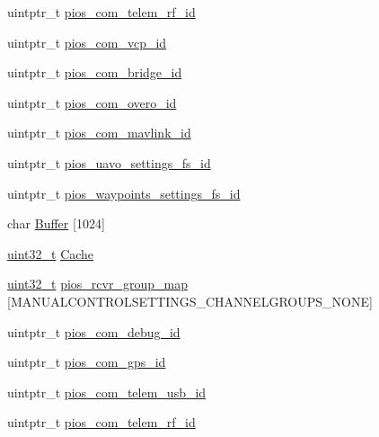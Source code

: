 \begin{DoxyCompactItemize}
\item 
uintptr\-\_\-t \hyperlink{group___open_pilot_core_gae48e848f715b08971e23528feee79339}{pios\-\_\-com\-\_\-telem\-\_\-rf\-\_\-id}
\item 
uintptr\-\_\-t \hyperlink{group___open_pilot_core_gaaeb3e0d65ed5c6e7b921c54e1ad905db}{pios\-\_\-com\-\_\-vcp\-\_\-id}
\item 
uintptr\-\_\-t \hyperlink{group___open_pilot_core_gac040f05fa048688ee0269c2768698a14}{pios\-\_\-com\-\_\-bridge\-\_\-id}
\item 
uintptr\-\_\-t \hyperlink{group___open_pilot_core_ga048f2bb98de60944f135effb407a1139}{pios\-\_\-com\-\_\-overo\-\_\-id}
\item 
uintptr\-\_\-t \hyperlink{group___open_pilot_core_gabdefeb92517c08b2db19b764db941de9}{pios\-\_\-com\-\_\-mavlink\-\_\-id}
\item 
uintptr\-\_\-t \hyperlink{group___open_pilot_core_gab060f441dd600b08386c0ca1b487217a}{pios\-\_\-uavo\-\_\-settings\-\_\-fs\-\_\-id}
\item 
uintptr\-\_\-t \hyperlink{group___open_pilot_core_ga4b04979e5fb31eaa66088178605835cd}{pios\-\_\-waypoints\-\_\-settings\-\_\-fs\-\_\-id}
\item 
char \hyperlink{group___open_pilot_core_gaaf1490d688e7cf0c41987d87572ff80a}{Buffer} \mbox{[}1024\mbox{]}
\item 
\hyperlink{stdint_8h_a435d1572bf3f880d55459d9805097f62}{uint32\-\_\-t} \hyperlink{group___open_pilot_core_gaef8c3e152589675df7f5b49cc1ba7ffd}{Cache}
\item 
\hyperlink{stdint_8h_a435d1572bf3f880d55459d9805097f62}{uint32\-\_\-t} \hyperlink{group___open_pilot_core_ga6c6cfc16eb738e47c123298e062297e2}{pios\-\_\-rcvr\-\_\-group\-\_\-map} \mbox{[}M\-A\-N\-U\-A\-L\-C\-O\-N\-T\-R\-O\-L\-S\-E\-T\-T\-I\-N\-G\-S\-\_\-\-C\-H\-A\-N\-N\-E\-L\-G\-R\-O\-U\-P\-S\-\_\-\-N\-O\-N\-E\mbox{]}
\item 
uintptr\-\_\-t \hyperlink{group___open_pilot_core_ga14dc9e3d330b80a37a9699c2112358e0}{pios\-\_\-com\-\_\-debug\-\_\-id}
\item 
uintptr\-\_\-t \hyperlink{group___open_pilot_core_ga05dca72c42c6c2b33fa62b8ee0fcb2ea}{pios\-\_\-com\-\_\-gps\-\_\-id}
\item 
uintptr\-\_\-t \hyperlink{group___open_pilot_core_ga513cc36d72b76de2fcb75ff233a79a4a}{pios\-\_\-com\-\_\-telem\-\_\-usb\-\_\-id}
\item 
uintptr\-\_\-t \hyperlink{group___open_pilot_core_gae48e848f715b08971e23528feee79339}{pios\-\_\-com\-\_\-telem\-\_\-rf\-\_\-id}

\end{DoxyCompactItemize}
